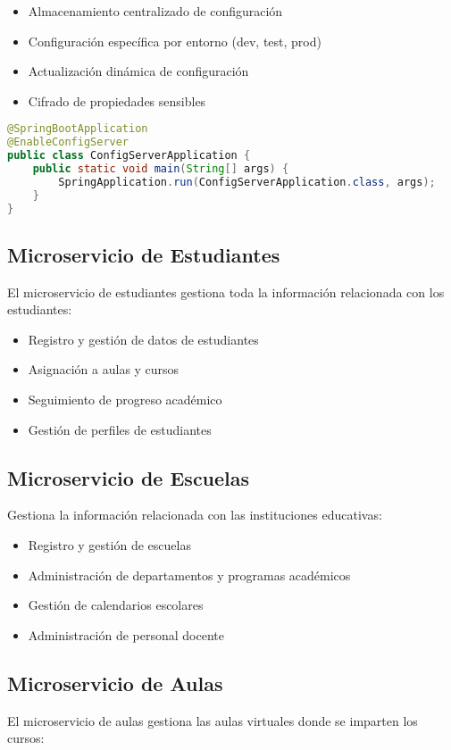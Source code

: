 \documentclass[12pt,a4paper]{report}
\begin{document}
\begin{itemize}
    \item Almacenamiento centralizado de configuración
    \item Configuración específica por entorno (dev, test, prod)
    \item Actualización dinámica de configuración
    \item Cifrado de propiedades sensibles
\end{itemize}

\begin{lstlisting}[language=Java, caption=Configuración del Config Server]
@SpringBootApplication
@EnableConfigServer
public class ConfigServerApplication {
    public static void main(String[] args) {
        SpringApplication.run(ConfigServerApplication.class, args);
    }
}
\end{lstlisting}

\subsection{Microservicio de Estudiantes}
El microservicio de estudiantes gestiona toda la información relacionada con los estudiantes:

\begin{itemize}
    \item Registro y gestión de datos de estudiantes
    \item Asignación a aulas y cursos
    \item Seguimiento de progreso académico
    \item Gestión de perfiles de estudiantes
\end{itemize}

\subsection{Microservicio de Escuelas}
Gestiona la información relacionada con las instituciones educativas:

\begin{itemize}
    \item Registro y gestión de escuelas
    \item Administración de departamentos y programas académicos
    \item Gestión de calendarios escolares
    \item Administración de personal docente
\end{itemize}

\subsection{Microservicio de Aulas}
El microservicio de aulas gestiona las aulas virtuales donde se imparten los cursos:
\end{document}
